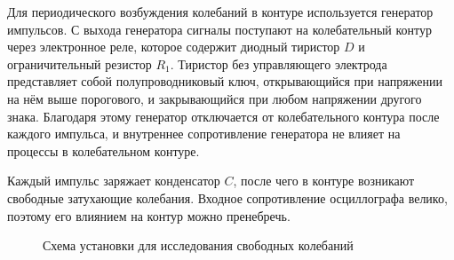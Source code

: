 Для периодического возбуждения колебаний в контуре используется генератор
импульсов. С выхода генератора сигналы поступают на колебательный контур через
электронное реле, которое содержит диодный тиристор $D$ и ограничительный
резистор $R_1$. Тиристор без управляющего электрода представляет собой
полупроводниковый ключ, открывающийся при напряжении на нём выше порогового, и
закрывающийся при любом напряжении другого знака. Благодаря этому генератор
отключается от колебательного контура после каждого импульса, и внутреннее
сопротивление генератора не влияет на процессы в колебательном контуре.

Каждый импульс заряжает конденсатор $C$, после чего в контуре возникают
свободные затухающие колебания. Входное сопротивление осциллографа велико,
поэтому его влиянием на контур можно пренебречь.
\begin{figure}[h!]
	\caption{Схема установки для исследования свободных колебаний}
\end{figure}

